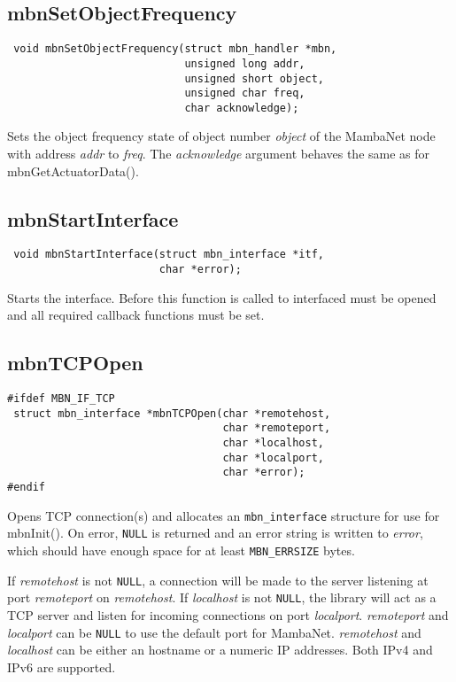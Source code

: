 \subsection{mbnSetObjectFrequency}
\begin{verbatim}
 void mbnSetObjectFrequency(struct mbn_handler *mbn,
                            unsigned long addr,
                            unsigned short object,
                            unsigned char freq,
                            char acknowledge);
\end{verbatim}
Sets the object frequency state of object number \textit{object} of the MambaNet node with address \textit{addr} to \textit{freq}. The \textit{acknowledge} argument behaves the same as for mbnGetActuatorData().


\subsection{mbnStartInterface}
\begin{verbatim}
 void mbnStartInterface(struct mbn_interface *itf,
                        char *error);
\end{verbatim}
Starts the interface. Before this function is called to interfaced must be opened and all required callback functions must be set.


\subsection{mbnTCPOpen}
\begin{verbatim}
#ifdef MBN_IF_TCP
 struct mbn_interface *mbnTCPOpen(char *remotehost,
                                  char *remoteport,
                                  char *localhost,
                                  char *localport,
                                  char *error);
#endif
\end{verbatim}
Opens TCP connection(s) and allocates an \verb|mbn_interface| structure for use for mbnInit(). On error, \verb|NULL| is returned and an error string is written to \textit{error}, which should have enough space for at least \verb|MBN_ERRSIZE| bytes.

If \textit{remotehost} is not \verb|NULL|, a connection will be made to the server listening at port \textit{remoteport} on \textit{remotehost}. If \textit{localhost} is not \verb|NULL|, the library will act as a TCP server and listen for incoming connections on port \textit{localport}. \textit{remoteport} and \textit{localport} can be \verb|NULL| to use the default port for MambaNet. \textit{remotehost} and \textit{localhost} can be either an hostname or a numeric IP addresses. Both IPv4 and IPv6 are supported.


